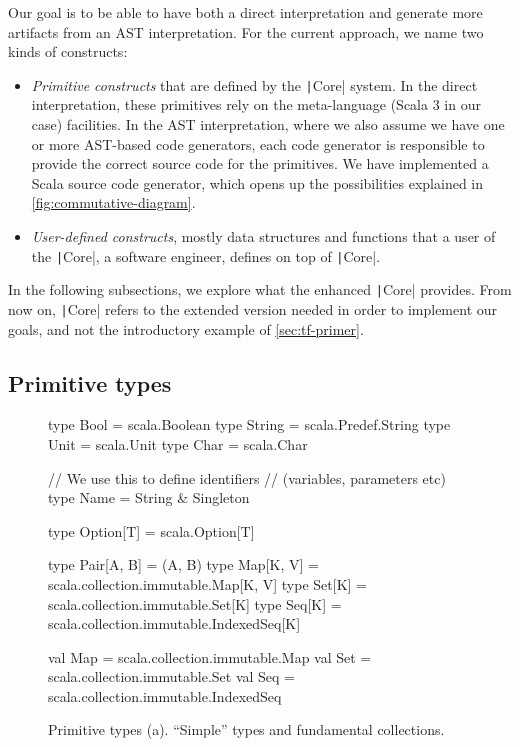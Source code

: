 \documentclass[11pt]{article}
\newcommand{\ScalaI}[1]{\texttt|#1|}
\begin{document}
Our goal is to be able to have both a direct interpretation and generate more 
artifacts from an AST interpretation. For the current approach, we name two 
kinds of constructs:
\begin{itemize}
  \item \textit{Primitive constructs} that are defined by the \ScalaI{Core} 
  system. In the direct interpretation, these primitives rely on the 
  meta-language (Scala 3 in our case) facilities. In the AST interpretation, 
  where we also assume we have one or more AST-based code generators, each 
  code generator is responsible to provide the correct source code for the 
  primitives. We have implemented a Scala source code generator, which opens 
  up the possibilities explained in \autoref{fig:commutative-diagram}.
  
  \item \textit{User-defined constructs}, mostly data structures and 
  functions that a user of the \ScalaI{Core}, a software engineer, defines on 
  top of \ScalaI{Core}.
\end{itemize}

In the following subsections, we explore what the enhanced \ScalaI{Core} 
provides. From now on, \ScalaI{Core} refers to the extended version needed in 
order to implement our goals, and not the introductory example of 
\autoref{sec:tf-primer}.
\subsection{Primitive types}
\label{sec:prim:types}

\begin{figure}[t]
\begin{ScalaBlock}
type Bool   = scala.Boolean
type String = scala.Predef.String
type Unit   = scala.Unit
type Char   = scala.Char

// We use this to define identifiers
// (variables, parameters etc)
type Name = String & Singleton

type Option[T]    = scala.Option[T]

type Pair[A, B] = (A, B)
type Map[K, V] = scala.collection.immutable.Map[K, V]
type Set[K] = scala.collection.immutable.Set[K]
type Seq[K] = scala.collection.immutable.IndexedSeq[K]

val Map = scala.collection.immutable.Map
val Set = scala.collection.immutable.Set
val Seq = scala.collection.immutable.IndexedSeq

\end{ScalaBlock}
\caption{Primitive types (a). ``Simple'' types and fundamental collections.}
\label{fig:prim:types}
\hrulefill
\end{figure}
\end{document}

